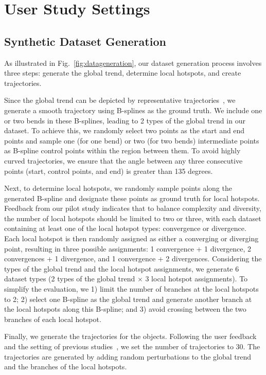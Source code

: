 \section{User Study Settings}
\label{sec:appendixC}
\subsection{Synthetic Dataset Generation}
As illustrated in Fig.~\ref{fig:datageneration}, our dataset generation process involves three steps: generate the global trend, determine local hotspots, and create trajectories.

Since the global trend can be depicted by representative trajectories~\cite{zheng2015trajectory}, we generate a smooth trajectory using B-splines as the ground truth.
We include one or two bends in these B-splines, leading to 2 types of the global trend in our dataset. 
To achieve this, we randomly select two points as the start and end points and sample one (for one bend) or two (for two bends) intermediate points as B-spline control points within the region between them.
To avoid highly curved trajectories, we ensure that the angle between any three consecutive points (start, control points, and end) is greater than 135 degrees.

Next, to determine local hotspots, we randomly sample points along the generated B-spline and designate these points as ground truth for local hotspots.
Feedback from our pilot study indicates that 
to balance complexity and diversity, the number of local hotspots should be limited to two or three, with each dataset containing at least one of the local hotspot types: convergence or divergence.
Each local hotspot is then randomly assigned as either a converging or diverging point, resulting in three possible assignments: 1 convergence + 1 divergence, 2 convergences + 1 divergence, and 1 convergence + 2 divergences.
Considering the types of the global trend and the local hotspot assignments, we generate 6 dataset types (2 types of the global trend $\times$ 3 local hotspot assignments).
To simplify the evaluation, we 1) limit the number of branches at the local hotspots to 2; 2) select one B-spline as the global trend and generate another branch at the local hotspots along this B-spline; and 3) avoid crossing between the two branches of each local hotspot. 


Finally, we generate the trajectories for the objects.
Following the user feedback and the setting of previous studies~\cite{zheng2018focus+}, we set the number of trajectories to 30.
The trajectories are generated by adding random perturbations to the global trend and the branches of the local hotspots.

